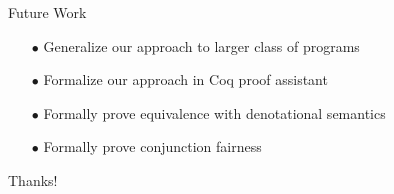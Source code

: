 \documentclass[14pt,aspectratio=169]{beamer}
\theoremstyle{definition}
\begin{document}
\begin{frame}[fragile]{Future Work}
\begin{itemize}
    \item[$\bullet$] Generalize our approach to larger class of programs
    \vskip5mm
    \item[$\bullet$] Formalize our approach in Coq proof assistant
    \vskip5mm
    \item[$\bullet$] Formally prove equivalence with denotational semantics
    \vskip5mm
    \item[$\bullet$] Formally prove conjunction fairness
\end{itemize}
\end{frame}



\begin{frame}
\begin{center}
{\Huge Thanks!}
\end{center}
\end{frame}
\end{document}
